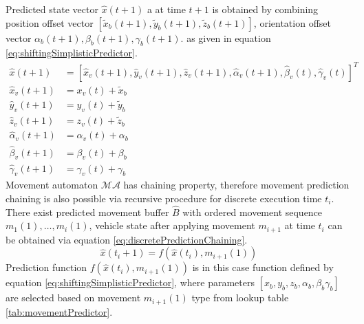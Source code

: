 Predicted state vector $\hat{x}(t+1)$ a at time $t+1$ is obtained by combining position offset vector $[\tilde{x}_b(t+1),\tilde{y}_b(t+1),\tilde{z}_b(t+1)]$, orientation offset vector $\alpha_b(t+1),\beta_b(t+1),\gamma_b(t+1)$. as given in equation \ref{eq:shiftingSimplisticPredictor}.
\begin{equation}\label{eq:shiftingSimplisticPredictor}
    \begin{aligned}
    \hat{x}(t+1) & = [\hat{x}_v(t+1),\hat{y}_v(t+1),\hat{z}_v(t+1),\hat{\alpha}_v(t+1),\hat{\beta}_v(t),\hat{\gamma}_v(t)]^T\\
    \hat{x}_v(t+1) & = x_v(t)+\tilde{x}_b\\
    \hat{y}_v(t+1) & = y_v(t)+\tilde{y}_b\\
    \hat{z}_v(t+1) & = z_v(t)+\tilde{z}_b\\
    \hat{\alpha}_v(t+1) & = \alpha_v(t) + \alpha_b\\
    \hat{\beta}_v(t+1) & = \beta_v(t) + \beta_b\\
    \hat{\gamma}_v(t+1) & = \gamma_v(t) + \gamma_b
    \end{aligned}
\end{equation}
Movement automaton $\mathscr{MA}$ has chaining property, therefore movement prediction chaining is also possible via recursive procedure for discrete execution time $t_i$. There exist predicted movement buffer $\hat{B}$ with ordered movement sequence $m_1(1),\dots,m_i(1)$, vehicle state after applying movement $m_{i+1}$ at time $t_i$ can be obtained via equation \ref{eq:discretePredictionChaining}.
\begin{equation}\label{eq:discretePredictionChaining}
    \hat{x}(t_i+1) = f(\hat{x}(t_i),m_{i+1}(1))
\end{equation}
Prediction function $f(\hat{x}(t_i),m_{i+1}(1))$ is in this case function defined by equation \ref{eq:shiftingSimplisticPredictor}, where parameters $[x_b,y_b,z_b,\alpha_b,\beta_b\gamma_b]$ are selected based on movement $m_{i+1}(1)$ type from lookup table  \ref{tab:movementPredictor}.


